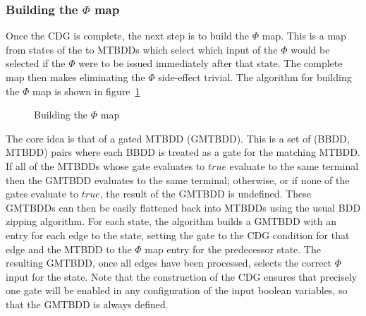 \subsubsection{Building the $\Phi$ map}

Once the CDG is complete, the next step is to build the $\Phi$ map.
This is a map from states of the {\StateMachine} to MTBDDs which
select which input of the $\Phi$ would be selected if the $\Phi$ were
to be issued immediately after that state.  The complete map then
makes eliminating the $\Phi$ side-effect trivial.  The algorithm for
building the $\Phi$ map is shown in
figure~\ref{fig:derive:phi:phi_map}

\begin{figure}
\begin{algorithmic}[1]
\EndFor
{}
\EndWhile
\end{algorithmic}
\caption{Building the $\Phi$ map}
\label{fig:derive:phi:phi_map}
\end{figure}

The core idea is that of a gated MTBDD (GMTBDD).  This is a set of
(BBDD, MTBDD) pairs where each BBDD is treated as a gate for the
matching MTBDD.  If all of the MTBDDs whose gate evaluates to $true$
evaluate to the same terminal then the GMTBDD evaluates to the same
terminal; otherwise, or if none of the gates evaluate to $true$, the
result of the GMTBDD is undefined.  These GMTBDDs can then be easily
flattened back into MTBDDs using the usual BDD zipping
algorithm. For each state, the algorithm builds a GMTBDD with an
entry for each edge to the state, setting the gate to the CDG
condition for that edge and the MTBDD to the $\Phi$ map entry for the
predecessor state.  The resulting GMTBDD, once all edges have been
processed, selects the correct $\Phi$ input for the state.  Note that
the construction of the CDG ensures that precisely one gate will be
enabled in any configuration of the input boolean variables, so that
the GMTBDD is always defined.

